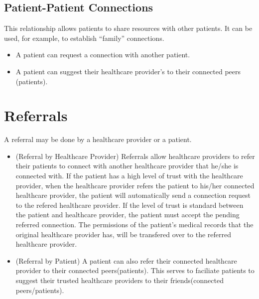 \subsection{Patient-Patient Connections}
This relationship allows patients to share resources with other patients. It can be used, for example, to establish ``family'' connections.
\begin{itemize}
\item A patient can request a connection with another patient. 
\item A patient can suggest their healthcare provider's to their connected peers (patients).
\end{itemize} 

\section{Referrals}
A referral may be done by a healthcare provider or a patient.

\begin{itemize}
\item (Referral by Healthcare Provider) Referrals allow healthcare providers to refer their patients to connect with another healthcare provider that he/she is connected with. If the patient has a high level of trust with the healthcare provider, when the healthcare provider refers the patient to his/her connected healthcare provider, the patient will automatically send a connection request to the refered healthcare provider. If the level of trust is standard between the patient and healthcare provider, the patient must accept the pending referred connection. The permissions of the patient's medical records that the original healthcare provider has, will be transfered over to the referred healthcare provider. 
\item (Referral by Patient) A patient can also refer their connected healthcare provider to their connected peers(patients). This serves to faciliate patients to suggest their trusted healthcare providers to their friends(connected peers/patients).
\end{itemize} 

